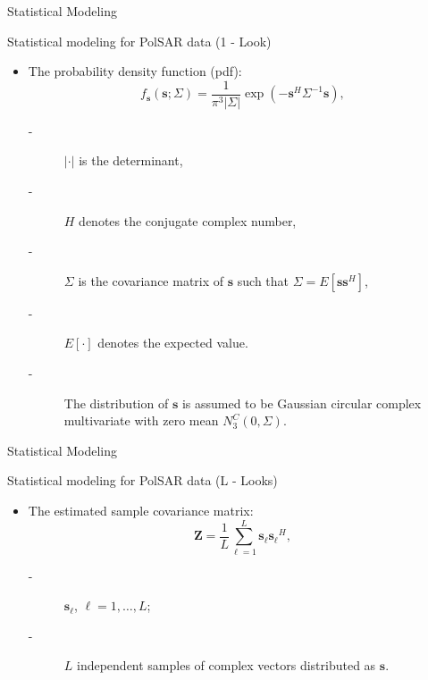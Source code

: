 \documentclass[10pt]{beamer}
\begin{document}
\begin{frame}[fragile]{Statistical Modeling}
\begin{alertblock}{Statistical modeling for PolSAR data (1 - Look)}
\begin{itemize}
\item The probability density function (pdf):
\begin{equation}
    f_{\mathbf{s}}(\mathbf{s};\Sigma)=\frac{1}{\pi^3|\Sigma|} \exp(-\mathbf{s}^H\Sigma^{-1}\mathbf{s}),
    \label{eq_02}
\end{equation}
        \begin{description}
        \item[-] $|\cdot|$ is the determinant, 
        \item[-] $H$ denotes the conjugate complex number, 
        \item[-] $\Sigma$ is the covariance matrix of $\mathbf{s}$ such that $\Sigma=E[\mathbf{ss}^H]$,
        \item[-] $E[\cdot]$ denotes the expected value. 
        \item[-] The distribution of $\mathbf{s}$ is assumed to be  Gaussian circular complex multivariate with zero mean $N^{C}_3(0,\Sigma)$.
        \end{description}
\end{itemize}
\end{alertblock}
\end{frame}
%
\begin{frame}[fragile]{Statistical Modeling}
\begin{alertblock}{Statistical modeling for PolSAR data (L - Looks)}
\begin{itemize}
\item The estimated sample covariance matrix:
\begin{equation}
    \mathbf{Z}=\frac{1}{L}\sum_{\ell=1}^{L} {\mathbf{s}_\ell}{\mathbf{s}_\ell}^H,
    \label{eq_03}
\end{equation}
\begin{description}
      \item[-] $\mathbf{s}_\ell$, $\ell = 1, \dots, L$;
      \item[-] $L$ independent samples of complex vectors distributed as $\mathbf{s}$. 
\end{description}
\end{itemize}
\end{alertblock}
\end{frame}
\end{document}
